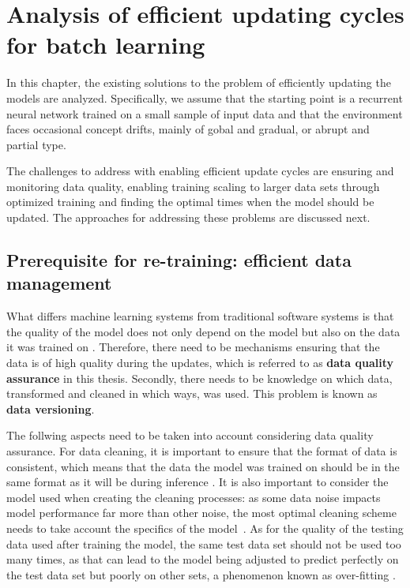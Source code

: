\chapter{Analysis of efficient updating cycles for batch learning}

In this chapter, the existing solutions to the problem of efficiently updating the models are analyzed. Specifically, we assume that the starting point is a recurrent neural network trained on a small sample of input data and that the environment faces occasional concept drifts, mainly of gobal and gradual, or abrupt and partial type.

The challenges to address with enabling efficient update cycles are ensuring and monitoring data quality, enabling training scaling to larger data sets through optimized training and finding the optimal times when the model should be updated. The approaches for addressing these problems are discussed next.

\section[Prerequisite for re-training: efficient data management]{Prerequisite for re-training: efficient data \\management}

What differs machine learning systems from traditional software systems is that the quality of the model does not only depend on the model but also on the data it was trained on \cite{polyzotis_data_2018}. Therefore, there need to be mechanisms ensuring that the data is of high quality during the updates, which is referred to as \textbf{data quality assurance} in this thesis. Secondly, there needs to be knowledge on which data, transformed and cleaned in which ways, was used. This problem is known as \textbf{data versioning}.

The follwing aspects need to be taken into account considering data quality assurance. For data cleaning, it is important to ensure that the format of data is consistent, which means that the data the model was trained on should be in the same format as it will be during inference \cite{polyzotis_data_2018}. It is also important to consider the model used when creating the cleaning processes: as some data noise impacts model performance far more than other noise, the most optimal cleaning scheme needs to take account the specifics of the model~\cite{renggli_data_2021}. As for the quality of the testing data used after training the model, the same test data set should not be used too many times, as that can lead to the model being adjusted to predict perfectly on the test data set but poorly on other sets, a phenomenon known as over-fitting \cite{renggli_data_2021}.


